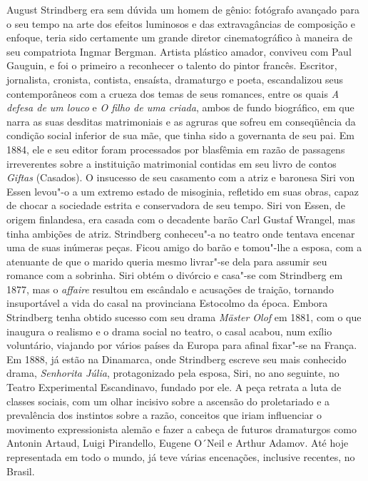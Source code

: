 August Strindberg era sem dúvida um homem de gênio: fotógrafo avançado
para o seu tempo na arte dos efeitos luminosos e das extravagâncias de
composição e enfoque, teria sido certamente um grande diretor
cinematográfico à maneira de seu compatriota Ingmar Bergman. Artista
plástico amador, conviveu com Paul Gauguin, e foi o primeiro a
reconhecer o talento do pintor francês. Escritor, jornalista, cronista,
contista, ensaísta, dramaturgo e poeta, escandalizou seus
contemporâneos com a crueza dos temas de seus romances, entre os quais
\textit{A defesa de um louco} e \textit{O filho de uma criada}, ambos
de fundo biográfico, em que narra as suas desditas matrimoniais e as
agruras que sofreu em conseqüência da condição social inferior de sua
mãe, que tinha sido a governanta de seu pai. Em 1884, ele e seu editor
foram processados por blasfêmia em razão de passagens irreverentes
sobre a instituição matrimonial contidas em seu livro de contos \textit{Giftas}
(Casados). O insucesso de seu casamento com a atriz e baronesa Siri von
Essen levou"-o a um extremo estado de misoginia, refletido em suas
obras, capaz de chocar a sociedade estrita e conservadora de seu tempo.
Siri von Essen, de origem finlandesa, era casada com o decadente barão
Carl Gustaf Wrangel, mas tinha ambições de atriz. Strindberg
conheceu"-a no teatro onde tentava encenar uma de suas inúmeras peças.
Ficou amigo do barão e tomou"-lhe a esposa, com a atenuante de que o
marido queria mesmo livrar"-se dela para assumir seu romance com a
sobrinha. Siri obtém o divórcio e casa"-se com Strindberg em 1877, mas
o \textit{affaire} resultou em escândalo e acusações de traição,
tornando insuportável a vida do casal na provinciana Estocolmo da
época. Embora Strindberg tenha obtido sucesso com seu drama
\textit{Mäster Olof} em 1881, com o que inaugura o realismo e o drama
social no teatro, o casal acabou, num exílio voluntário, viajando por
vários países da Europa para afinal fixar"-se na França. Em 1888, já
estão na Dinamarca, onde Strindberg escreve seu mais conhecido drama,
\textit{Senhorita Júlia}, protagonizado pela esposa, Siri, no ano
seguinte, no Teatro Experimental Escandinavo, fundado por ele. A peça
retrata a luta de classes sociais, com um olhar incisivo sobre a
ascensão do proletariado e a prevalência dos instintos sobre a razão,
conceitos que iriam influenciar o movimento expressionista alemão e
fazer a cabeça de futuros dramaturgos como Antonin Artaud, Luigi
Pirandello, Eugene O´Neil e Arthur Adamov. Até hoje representada em
todo o mundo, já teve várias encenações, inclusive recentes, no Brasil.


